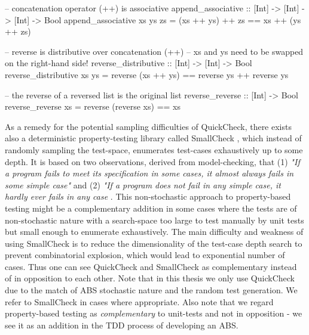 \begin{HaskellCode}
-- concatenation operator (++) is associative
append_associative :: [Int] -> [Int] -> [Int] -> Bool
append_associative xs ys zs = (xs ++ ys) ++ zs == xs ++ (ys ++ zs)

-- reverse is distributive over concatenation (++)
-- xs and ys need to be swapped on the right-hand side!
reverse_distributive :: [Int] -> [Int] -> Bool
reverse_distributive xs ys = reverse (xs ++ ys) == reverse ys ++ reverse ys

-- the reverse of a reversed list is the original list
reverse_reverse :: [Int] -> Bool
reverse_reverse xs = reverse (reverse xs) == xs
\end{HaskellCode}

As a remedy for the potential sampling difficulties of QuickCheck, there exists also a deterministic property-testing library called SmallCheck \cite{runciman_smallcheck_2008}, which instead of randomly sampling the test-space, enumerates test-cases exhaustively up to some depth. It is based on two observations, derived from model-checking, that (1) \textit{"If a program fails to meet its specification in some cases, it almost always fails in some simple case"} and (2) \textit{"If a program does not fail in any simple case, it hardly ever fails in any case} \cite{runciman_smallcheck_2008}. This non-stochastic approach to property-based testing might be a complementary addition in some cases where the tests are of non-stochastic nature with a search-space  too large to test manually by unit tests but small enough to enumerate exhaustively. The main difficulty and weakness of using SmallCheck is to reduce the dimensionality of the test-case depth search to prevent combinatorial explosion, which would lead to exponential number of cases. Thus one can see QuickCheck and SmallCheck as complementary instead of in opposition to each other.
Note that in this thesis we only use QuickCheck due to the match of ABS stochastic nature and the random test generation. We refer to SmallCheck in cases where appropriate. Also note that we regard property-based testing as \textit{complementary} to unit-tests and not in opposition - we see it as an addition in the TDD process of developing an ABS.
